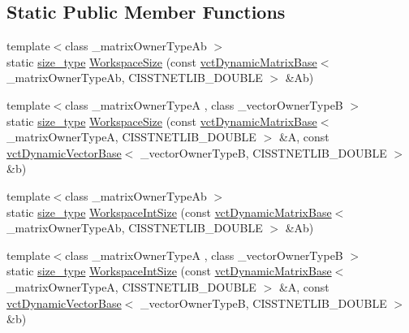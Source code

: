 \subsection*{Static Public Member Functions}
{\bf }\par
\begin{DoxyCompactItemize}
\item 
{\footnotesize template$<$class \+\_\+matrix\+Owner\+Type\+Ab $>$ }\\static \hyperlink{classnmr_n_n_l_s_dynamic_data_aff3aaadfea66b14eac2e3e022e41b35b}{size\+\_\+type} \hyperlink{classnmr_n_n_l_s_dynamic_data_acdb443c5bfa9547c2a4f76ae90a472dc}{Workspace\+Size} (const \hyperlink{classvct_dynamic_matrix_base}{vct\+Dynamic\+Matrix\+Base}$<$ \+\_\+matrix\+Owner\+Type\+Ab, C\+I\+S\+S\+T\+N\+E\+T\+L\+I\+B\+\_\+\+D\+O\+U\+B\+L\+E $>$ \&Ab)
\item 
{\footnotesize template$<$class \+\_\+matrix\+Owner\+Type\+A , class \+\_\+vector\+Owner\+Type\+B $>$ }\\static \hyperlink{classnmr_n_n_l_s_dynamic_data_aff3aaadfea66b14eac2e3e022e41b35b}{size\+\_\+type} \hyperlink{classnmr_n_n_l_s_dynamic_data_ae3913fd6284552bbbb4cb9503dc3effa}{Workspace\+Size} (const \hyperlink{classvct_dynamic_matrix_base}{vct\+Dynamic\+Matrix\+Base}$<$ \+\_\+matrix\+Owner\+Type\+A, C\+I\+S\+S\+T\+N\+E\+T\+L\+I\+B\+\_\+\+D\+O\+U\+B\+L\+E $>$ \&A, const \hyperlink{classvct_dynamic_vector_base}{vct\+Dynamic\+Vector\+Base}$<$ \+\_\+vector\+Owner\+Type\+B, C\+I\+S\+S\+T\+N\+E\+T\+L\+I\+B\+\_\+\+D\+O\+U\+B\+L\+E $>$ \&b)
\end{DoxyCompactItemize}

{\bf }\par
\begin{DoxyCompactItemize}
\item 
{\footnotesize template$<$class \+\_\+matrix\+Owner\+Type\+Ab $>$ }\\static \hyperlink{classnmr_n_n_l_s_dynamic_data_aff3aaadfea66b14eac2e3e022e41b35b}{size\+\_\+type} \hyperlink{classnmr_n_n_l_s_dynamic_data_ae36de3c64a18859d6c2372a8749b11ca}{Workspace\+Int\+Size} (const \hyperlink{classvct_dynamic_matrix_base}{vct\+Dynamic\+Matrix\+Base}$<$ \+\_\+matrix\+Owner\+Type\+Ab, C\+I\+S\+S\+T\+N\+E\+T\+L\+I\+B\+\_\+\+D\+O\+U\+B\+L\+E $>$ \&Ab)
\item 
{\footnotesize template$<$class \+\_\+matrix\+Owner\+Type\+A , class \+\_\+vector\+Owner\+Type\+B $>$ }\\static \hyperlink{classnmr_n_n_l_s_dynamic_data_aff3aaadfea66b14eac2e3e022e41b35b}{size\+\_\+type} \hyperlink{classnmr_n_n_l_s_dynamic_data_a56e4be818f6b6e6b63d6e97dc0a2c573}{Workspace\+Int\+Size} (const \hyperlink{classvct_dynamic_matrix_base}{vct\+Dynamic\+Matrix\+Base}$<$ \+\_\+matrix\+Owner\+Type\+A, C\+I\+S\+S\+T\+N\+E\+T\+L\+I\+B\+\_\+\+D\+O\+U\+B\+L\+E $>$ \&A, const \hyperlink{classvct_dynamic_vector_base}{vct\+Dynamic\+Vector\+Base}$<$ \+\_\+vector\+Owner\+Type\+B, C\+I\+S\+S\+T\+N\+E\+T\+L\+I\+B\+\_\+\+D\+O\+U\+B\+L\+E $>$ \&b)
\end{DoxyCompactItemize}

